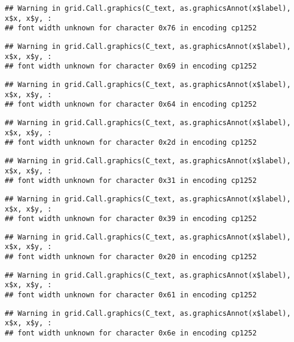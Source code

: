 \documentclass[
]{article}
\begin{document}
\begin{verbatim}
## Warning in grid.Call.graphics(C_text, as.graphicsAnnot(x$label), x$x, x$y, :
## font width unknown for character 0x76 in encoding cp1252
\end{verbatim}

\begin{verbatim}
## Warning in grid.Call.graphics(C_text, as.graphicsAnnot(x$label), x$x, x$y, :
## font width unknown for character 0x69 in encoding cp1252
\end{verbatim}

\begin{verbatim}
## Warning in grid.Call.graphics(C_text, as.graphicsAnnot(x$label), x$x, x$y, :
## font width unknown for character 0x64 in encoding cp1252
\end{verbatim}

\begin{verbatim}
## Warning in grid.Call.graphics(C_text, as.graphicsAnnot(x$label), x$x, x$y, :
## font width unknown for character 0x2d in encoding cp1252
\end{verbatim}

\begin{verbatim}
## Warning in grid.Call.graphics(C_text, as.graphicsAnnot(x$label), x$x, x$y, :
## font width unknown for character 0x31 in encoding cp1252
\end{verbatim}

\begin{verbatim}
## Warning in grid.Call.graphics(C_text, as.graphicsAnnot(x$label), x$x, x$y, :
## font width unknown for character 0x39 in encoding cp1252
\end{verbatim}

\begin{verbatim}
## Warning in grid.Call.graphics(C_text, as.graphicsAnnot(x$label), x$x, x$y, :
## font width unknown for character 0x20 in encoding cp1252
\end{verbatim}

\begin{verbatim}
## Warning in grid.Call.graphics(C_text, as.graphicsAnnot(x$label), x$x, x$y, :
## font width unknown for character 0x61 in encoding cp1252
\end{verbatim}

\begin{verbatim}
## Warning in grid.Call.graphics(C_text, as.graphicsAnnot(x$label), x$x, x$y, :
## font width unknown for character 0x6e in encoding cp1252
\end{verbatim}
\end{document}
